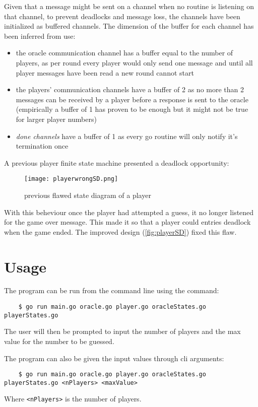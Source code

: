 \documentclass[12pt, a4paper]{report}
\begin{document}
Given that a message might be sent on a channel when no routine is listening on that channel, to prevent deadlocks and message loss, the channels have
 been initialized as buffered channels.
The dimension of the buffer for each channel has been inferred from use:
\begin{itemize}
    \item the oracle communication channel has a buffer equal to the number of players, as per round every player would only send one message and 
 until all player messages have been read a new round cannot start
    \item the players' communication channels have a buffer of 2 as no more than 2 messages can be received by a player before a response is sent to the oracle
 (empirically a buffer of 1 has proven to be enough but it might not be true for larger player numbers)
    \item \emph{done channels} have a buffer of 1 as every go routine will only notify it's termination once
\end{itemize}


A previous player finite state machine presented a deadlock opportunity:

\begin{figure}
    \centering
    \texttt{[image: playerwrongSD.png]}
    \caption{previous flawed state diagram of a player}
    \label{fig:playerwrongSD}
\end{figure}

With this beheviour once the player had attempted a guess, it no longer listened for the game over message. This made it so that a player could entries
 deadlock when the game ended. The improved design (\ref{fig:playerSD}) fixed this flaw.

\chapter{Usage}
The program can be run from the command line using the command:
\begin{lstlisting}
    $ go run main.go oracle.go player.go oracleStates.go playerStates.go
\end{lstlisting}
The user will then be prompted to input the number of players and the max value for the number to be guessed.

The program can also be given the input values through cli arguments:
\begin{lstlisting}
    $ go run main.go oracle.go player.go oracleStates.go playerStates.go <nPlayers> <maxValue>
\end{lstlisting}
Where \verb|<nPlayers>| is the number of players.
\end{document}
